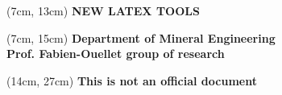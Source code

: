 \documentclass[12pt, a4paper, oneside]{article}
\newcommand{\origin}{Department of Mineral Engineering \\ 
Prof. Fabien-Ouellet group of research}
\newcommand{\documentnamecaps}{NEW LATEX TOOLS}
\begin{document}
\begin{titlepage}
	\begin{textblock*}{13cm}(7cm, 13cm)
		{\bfseries\Huge
    		\color{black}
    		\flushright
    		{\fontsize{40}{40}\selectfont \documentnamecaps}
		}   
	\end{textblock*}

	\begin{textblock*}{13cm}(7cm, 15cm)
		{\bfseries
			\vspace{-0.1cm}
			\color{red}
			\flushright
			\normalsize
			\origin\\
		}   
	\end{textblock*}

	\begin{textblock*}{10cm}(14cm, 27cm)
		{\bfseries\small
  		  	\color{black}
  		  	\flushright
			This is not an official document
		}
	\end{textblock*}

    \vspace*{\baselineskip}
\end{titlepage}

\begingroup
    \fontsize{14pt}{18pt}\selectfont
    \newpage
    \renewcommand{\contentsname}{\bfseries\Large\color{black} TABLE OF CONTENTS\hfill}   
    \makeatletter
    \renewcommand{\l@section}{\bfseries\@dottedtocline{1}{0em}{2em}}
	\renewcommand{\l@subsection}{\mdseries\@dottedtocline{2}{0.5em}{2.5em}}
	\renewcommand{\l@subsubsection}{\@dottedtocline{3}{1.0em}{3.5em}}
    \makeatother
    \flushleft
    \tableofcontents
    \newpage
\endgroup

\begingroup
	\renewcommand{\listtablename}{\color{black} LIST OF TABLES}
	\renewcommand{\listfigurename}{\color{black} LIST OF FIGURES}
	\listoftables
	\listoffigures
	\newpage
\endgroup



\end{document}
